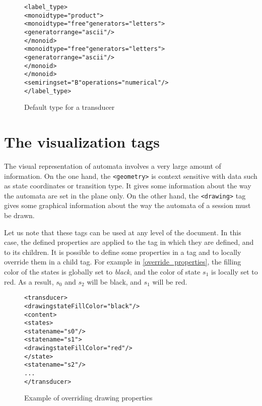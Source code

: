 \documentclass[a4paper]{article}
\newcommand{\xtag}[1]{\texttt{<#1>}}
\def\geometrytag{\xtag{geometry}}
\def\drawingtag{\xtag{drawing}}
\begin{document}
\begin{figure}[ht]
  \begin{center}
\begin{alltt}
<label_type>
  <monoid type="product">
     <monoid type="free" generators="letters">
       <generator range="ascii"/>
     </monoid>
     <monoid type="free" generators="letters">
       <generator range="ascii"/>
     </monoid>
  </monoid>
  <semiring set="B" operations="numerical"/>
</label_type>
\end{alltt}

\caption{Default type for a transducer}
\label{transducertype}
  \end{center}
\end{figure}

\newpage
\section{The visualization tags}
\label{title_vizualisation}
The visual representation of automata involves a very large amount of
information. On the one hand, the \geometrytag{} is context sensitive
with data such as state coordinates or transition type. It gives some
information about the way the automata are set in the plane only.  On
the other hand, the \drawingtag{} tag gives some graphical information
about the way the automata of a session must be drawn.

Let us note that these tags can be used at any level of the document.
In this case, the defined properties are applied to the tag in which
they are defined, and to its children. It is possible to define some
properties in a tag and to locally override them in a child tag. For
example in \autoref{override_properties}, the filling color of the
states is globally set to \textit{black}, and the color of state $s_1$
is locally set to red. As a result, $s_0$ and $s_2$ will be black, and
$s_1$ will be red.

\begin{figure}[ht]
  \small
  \begin{center}
\begin{alltt}
<transducer>
  <drawing stateFillColor="black"/>
  <content>
     <states>
        <state name="s0"/>
        <state name="s1">
            <drawing stateFillColor="red"/>
        </state>
        <state name="s2"/>
      ...
</transducer>
\end{alltt}

    \caption{Example of overriding drawing properties}
    \label{override_properties}
  \end{center}
\end{figure}
\end{document}
